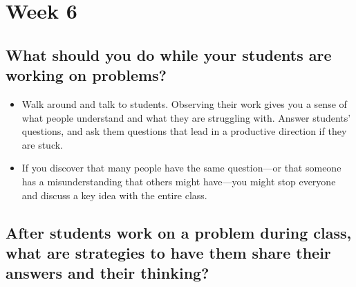 \section{Week 6}
\label{sec:week-6}

\subsection{What should you do while your students are working on problems?}
\label{sec:what-should-you}

\begin{itemize}
\item Walk around and talk to students. Observing their work gives you a sense of what people understand and what they are struggling with. Answer students’ questions, and ask them questions that lead in a productive direction if they are stuck.
  
\item If you discover that many people have the same question—or that someone has a misunderstanding that others might have—you might stop everyone and discuss a key idea with the entire class.
\end{itemize}

\subsection{After students work on a problem during class, what are strategies to have them share their answers and their thinking?}
\label{sec:after-students-work}

